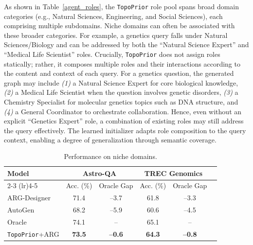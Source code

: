 \documentclass[lettersize,journal]{IEEEtran}
\theoremstyle{plain}
\begin{document}
As shown in Table~\ref{agent_roles}, the \texttt{TopoPrior} role pool spans broad domain categories (e.g., Natural Sciences, Engineering, and Social Sciences), each comprising multiple subdomains. Niche domains can often be associated with these broader categories. For example, a genetics query falls under Natural Sciences/Biology and can be addressed by both the ``Natural Science Expert'' and ``Medical Life Scientist'' roles. Crucially, \texttt{TopoPrior} does not assign roles statically; rather, it composes multiple roles and their interactions according to the content and context of each query. For a genetics question, the generated graph may include
\textit{(1)} a Natural Science Expert for core biological knowledge,
\textit{(2)} a Medical Life Scientist when the question involves genetic disorders,
\textit{(3)} a Chemistry Specialist for molecular genetics topics such as DNA structure, and
\textit{(4)} a General Coordinator to orchestrate collaboration.
Hence, even without an explicit ``Genetics Expert'' role, a combination of existing roles may still address the query effectively. The learned initializer adapts role composition to the query context, enabling a degree of generalization through semantic coverage.




\begin{table}[!t]
\centering
\caption{Performance on niche domains.}
\small
\setlength{\tabcolsep}{3pt}
\renewcommand{\arraystretch}{1.1}
\begin{tabular}{lccccc}
\toprule
\textbf{Model} & \multicolumn{2}{c}{\textbf{Astro-QA}} & \multicolumn{2}{c}{\textbf{TREC Genomics}} \\
\cmidrule(lr){2-3} \cmidrule(lr){4-5}
     & Acc. (\%) & Oracle Gap & Acc. (\%) & Oracle Gap \\
\midrule
ARG-Designer       & 71.4  & --3.7   & 61.8 & --3.3 \\
AutoGen            & 68.2  & --5.9   & 60.6 & --4.5 \\
Oracle             & 74.1  & --      & 65.1 & -- \\
\texttt{TopoPrior}+ARG       & \textbf{73.5} & \textbf{--0.6} & \textbf{64.3} & \textbf{--0.8} \\
\bottomrule
\end{tabular}
\label{niche_domains}
\vspace{-1em}
\end{table}
\end{document}
